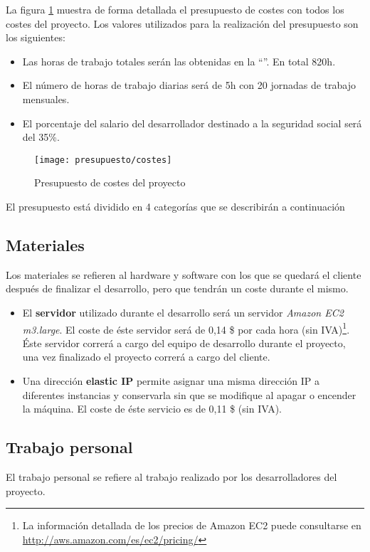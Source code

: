 La figura \ref{fig:presupuesto_costes} muestra de forma detallada el presupuesto de costes con todos los costes del proyecto.  Los valores utilizados para la realización del presupuesto son los siguientes:
\begin{itemize}
	\item Las horas de trabajo totales serán las obtenidas en la ``''. En total 820h.
	\item El número de horas de trabajo diarias será de 5h con 20 jornadas de trabajo mensuales.
	\item El porcentaje del salario del desarrollador destinado a la seguridad social será del 35\%.
\end{itemize}


	\begin{figure}[h]
		\centering
		\texttt{[image: presupuesto/costes]}
		\caption{Presupuesto de costes del proyecto}
		\label{fig:presupuesto_costes}
	\end{figure}

El presupuesto está dividido en 4 categorías que se describirán a continuación

\subsection{Materiales}
	Los materiales se refieren al hardware y software con los que se quedará el cliente después de finalizar el desarrollo, pero que tendrán un coste durante el mismo.
	\begin{itemize}
		\item El \textbf{servidor} utilizado durante el desarrollo será un servidor \textit{Amazon EC2 m3.large}. El coste de éste servidor será de 0,14 \$ por cada hora (sin IVA)\footnote{La información detallada de los precios de Amazon EC2 puede consultarse en \url{http://aws.amazon.com/es/ec2/pricing/}}.  Éste servidor correrá a cargo del equipo de desarrollo durante el proyecto, una vez finalizado el proyecto correrá a cargo del cliente.
		\item Una dirección \textbf{elastic IP} permite asignar una misma dirección IP a diferentes instancias y conservarla sin que se modifique al apagar o encender la máquina.  El coste de éste servicio es de 0,11 \$ (sin IVA).
	\end{itemize}

\subsection{Trabajo personal}
	El trabajo personal se refiere al trabajo realizado por los desarrolladores del proyecto.
	
